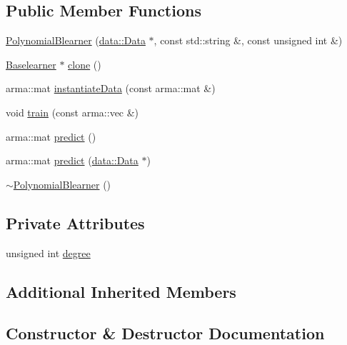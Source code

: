 \subsection*{Public Member Functions}
\begin{DoxyCompactItemize}
\item 
\mbox{\hyperlink{classblearner_1_1_polynomial_blearner_a295589dd57691401ccaf49e4ec5cca8f}{Polynomial\+Blearner}} (\mbox{\hyperlink{classdata_1_1_data}{data\+::\+Data}} $\ast$, const std\+::string \&, const unsigned int \&)
\item 
\mbox{\hyperlink{classblearner_1_1_baselearner}{Baselearner}} $\ast$ \mbox{\hyperlink{classblearner_1_1_polynomial_blearner_a4a93ace818c330e5d1f572108ba061c0}{clone}} ()
\item 
arma\+::mat \mbox{\hyperlink{classblearner_1_1_polynomial_blearner_a5d3a44e8a4a8155ac24ee05e2c68af75}{instantiate\+Data}} (const arma\+::mat \&)
\item 
void \mbox{\hyperlink{classblearner_1_1_polynomial_blearner_acf24025a73293a2569450dd4659e0997}{train}} (const arma\+::vec \&)
\item 
arma\+::mat \mbox{\hyperlink{classblearner_1_1_polynomial_blearner_a422569884414d31db5a2b770b22176c3}{predict}} ()
\item 
arma\+::mat \mbox{\hyperlink{classblearner_1_1_polynomial_blearner_ae321c17adaab23b0d27685920c2608af}{predict}} (\mbox{\hyperlink{classdata_1_1_data}{data\+::\+Data}} $\ast$)
\item 
\mbox{\hyperlink{classblearner_1_1_polynomial_blearner_ac3acf16e62db3dc6c34b4290f9f04f04}{$\sim$\+Polynomial\+Blearner}} ()
\end{DoxyCompactItemize}
\subsection*{Private Attributes}
\begin{DoxyCompactItemize}
\item 
unsigned int \mbox{\hyperlink{classblearner_1_1_polynomial_blearner_a7a522e19634367a4bfad2d6ea532ec44}{degree}}
\end{DoxyCompactItemize}
\subsection*{Additional Inherited Members}


\subsection{Constructor \& Destructor Documentation}
\mbox{\label{classblearner_1_1_polynomial_blearner_a295589dd57691401ccaf49e4ec5cca8f}} 
